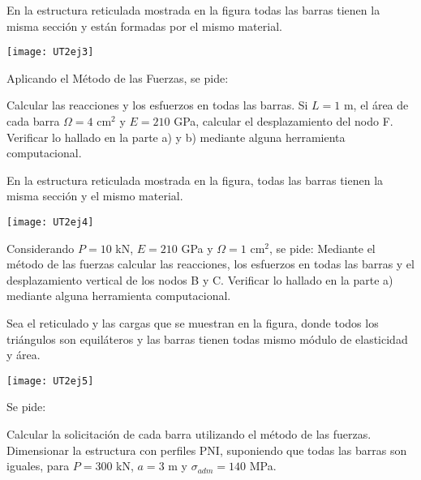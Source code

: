 \ejercicio

En la estructura reticulada mostrada en la figura todas las barras tienen la misma sección y están formadas por el mismo material. %

\begin{center}
	\texttt{[image: UT2ej3]}
\end{center}

Aplicando el Método de las Fuerzas, se pide:

\parte Calcular las reacciones y los esfuerzos en todas las barras.
%
\parte Si $L=1$ m, el área de cada barra $\Omega=4$ cm$^2$ y $E=210$ GPa, calcular el desplazamiento del nodo F.
%
\parte Verificar lo hallado en la parte a) y b) mediante alguna herramienta computacional.


\ejercicio

En la estructura reticulada mostrada en la figura, todas las barras tienen la misma sección y el mismo material.

\begin{center}
	\texttt{[image: UT2ej4]}
\end{center}

Considerando  $P=10$ kN, $E=210$ GPa y $\Omega=1$ cm$^2$, se pide:
%
\parte Mediante el método de las fuerzas calcular las reacciones, los esfuerzos en todas las barras y el desplazamiento vertical de los nodos B y C. 
%
\parte Verificar lo hallado en la parte a) mediante alguna herramienta computacional.


\ejercicio
Sea el reticulado y las cargas que se muestran en la figura, donde todos los triángulos son equiláteros y las barras tienen todas mismo módulo de elasticidad y área.

\begin{center}
	\texttt{[image: UT2ej5]}
\end{center}

Se pide:

\parte Calcular la solicitación de cada barra utilizando el método de las fuerzas.
\parte Dimensionar la estructura con perfiles PNI, suponiendo que todas las barras son iguales, para $P=300$ kN, $a=3$ m y $\sigma_{adm}=140$ MPa.

